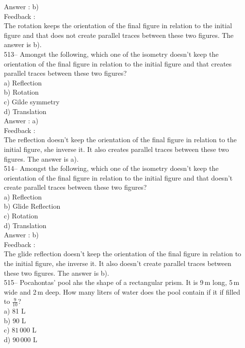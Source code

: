 \documentclass[letterpaper, 12pt]{article}
\begin{document}
Answer : b)\\

Feedback :\\
The rotation keeps the orientation of the final figure in relation to the initial figure and that does not create parallel traces between these two figures. The answer is b).\\

513--  Amongst the following, which one of the isometry doesn't keep the orientation of the final figure in relation to the initial figure and that creates parallel traces between these two figures?\\
a) Reflection\\
b) Rotation\\
c) Gilde symmetry\\
d) Translation\\

Answer : a)\\

Feedback :\\
The reflection doesn't keep the orientation of the final figure in relation to the initial figure, she inverse it. It also creates parallel traces between these two figures. The answer is a).\\

514--  Amongst the following, which one of the isometry doesn't keep the orientation of the final figure in relation to the initial figure and that doesn't create parallel traces between these two figures? \\
a) Reflection\\
b) Glide Reflection\\
c) Rotation\\
d) Translation\\

Answer : b)\\

Feedback :\\
The glide reflection doesn't keep the orientation of the final figure in relation to the initial figure, she inverse it. It also doesn't create parallel traces between these two figures. The answer is b).\\

515-- Pocahontas' pool ahs the shape of a rectangular prism. It is 9\,m long, 5\,m wide and 2\,m deep. How many liters of water does the pool contain if it if filled to $\frac{9}{10}$?\\
a) 81 L\\
b) 90 L\\
c) $81\,000$ L\\
d) $90\,000$ L\\
\end{document}
